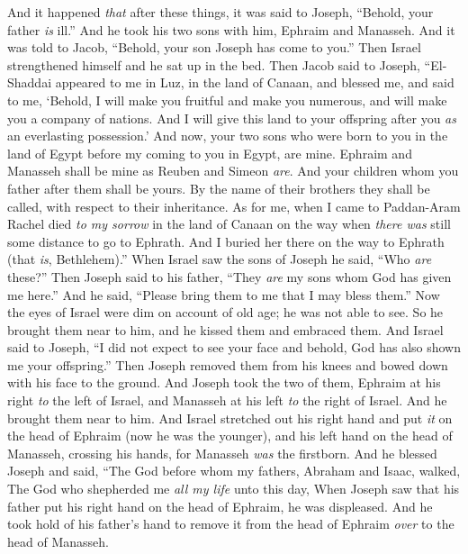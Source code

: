 \begin{biblechapter} %
 And it happened \textit{that} after these things, it was said to Joseph, “Behold, your father \textit{is} ill.” And he took his two sons with him, Ephraim and Manasseh.
\verse And it was told to Jacob, “Behold, your son Joseph has come to you.” Then Israel strengthened himself and he sat up in the bed.
\verse Then Jacob said to Joseph, “El-Shaddai appeared to me in Luz, in the land of Canaan, and blessed me,
\verse and said to me, ‘Behold, I will make you fruitful and make you numerous, and will make you a company of nations. And I will give this land to your offspring after you \textit{as} an everlasting possession.’
\verse And now, your two sons who were born to you in the land of Egypt before my coming to you in Egypt, are mine. Ephraim and Manasseh shall be mine as Reuben and Simeon \textit{are}.
\verse And your children whom you father after them shall be yours. By the name of their brothers they shall be called, with respect to their inheritance.
\verse As for me, when I came to Paddan-Aram Rachel died \textit{to my sorrow} in the land of Canaan on the way when \textit{there was} still some distance to go to Ephrath. And I buried her there on the way to Ephrath (that \textit{is}, Bethlehem).”
\verse When Israel saw the sons of Joseph he said, “Who \textit{are} these?”
\verse Then Joseph said to his father, “They \textit{are} my sons whom God has given me here.” And he said, “Please bring them to me that I may bless them.”
\verse Now the eyes of Israel were dim on account of old age; he was not able to see. So he brought them near to him, and he kissed them and embraced them.
\verse And Israel said to Joseph, “I did not expect to see your face and behold, God has also shown me your offspring.”
\verse Then Joseph removed them from his knees and bowed down with his face to the ground.
\verse And Joseph took the two of them, Ephraim at his right \textit{to} the left of Israel, and Manasseh at his left \textit{to} the right of Israel. And he brought them near to him.
\verse And Israel stretched out his right hand and put \textit{it} on the head of Ephraim (now he was the younger), and his left hand on the head of Manasseh, crossing his hands, for Manasseh \textit{was} the firstborn.
\verse And he blessed Joseph and said,
\verse “The God before whom my fathers, Abraham and Isaac, walked, 
The God who shepherded me \textit{all my life} unto this day,
\verse When Joseph saw that his father put his right hand on the head of Ephraim, he was displeased. And he took hold of his father’s hand to remove it from the head of Ephraim \textit{over} to the head of Manasseh.

\end{biblechapter}
